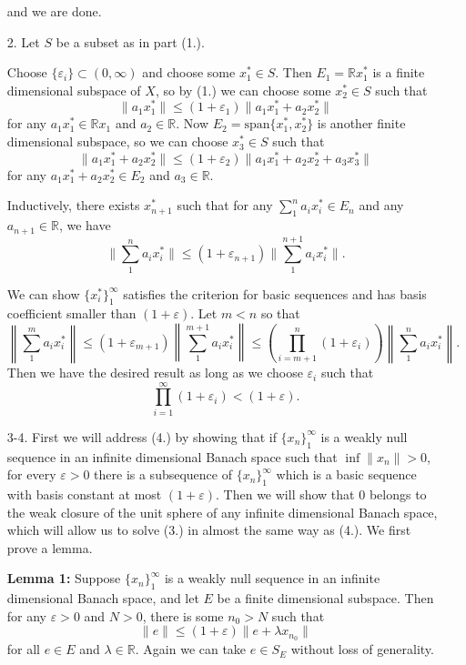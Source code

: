 \documentclass[11pt, reqno]{article}
\theoremstyle{plain}
\theoremstyle{definition}
\theoremstyle{remark}
\renewcommand{\epsilon}{\varepsilon}
\newcommand{\RR}{\mathbb{R}}
\begin{document}
\begin{enumerate}
    and we are done.

    \item[2.] Let $S$ be a subset as in part (1.). 
    
    Choose $\{\epsilon_i\} \subset (0, \infty)$ and choose some $x_1^* \in S$. Then $E_1 = \RR x_1^*$ is a finite
    dimensional subspace of $X$, so by (1.) we can choose some $x_2^* \in S$ such that 
    \[  
        \|a_1 x_1^*\| \leq (1 + \epsilon_1)\|a_1 x_1^* + a_2 x_2^*\|
    \]
    for any $a_1 x_1^* \in \RR x_1$ and $a_2 \in \RR$. Now $E_2 = \text{span}\{x_1^*, x_2^*\}$ is another finite dimensional
    subspace, so we can choose $x_3^* \in S$ such that
    \[
        \|a_1 x_1^* + a_2 x_2^*\| \leq (1 + \epsilon_2)\|a_1 x_1^* + a_2 x_2^* + a_3 x_3^*\|
    \]
    for any $a_1 x_1^* + a_2 x_2^* \in E_2$ and $a_3 \in \RR$.

    Inductively, there exists $x_{n + 1}^*$ such that for any $\sum_1^n a_i x_i^* \in E_n$ and any $a_{n + 1} \in \RR$,
    we have
    \[
        \|\sum_1^n a_i x_i^*\| \leq (1 + \epsilon_{n + 1})\|\sum_1^{n+1}a_i x_i^*\|.
    \]

    We can show $\{x_i^*\}_1^\infty$ satisfies the criterion for basic sequences and has basis coefficient
    smaller than $(1 + \epsilon)$. Let $m < n$ so that
    \[  
        \left\|\sum_1^m a_i x_i^*\right\| \leq (1 + \epsilon_{m+1})\left\|\sum_1^{m+1}a_i x_i^*\right\|
        \leq \left(\prod_{i = m+1}^n (1 + \epsilon_i)\right)\left\|\sum_1^n a_i x_i^*\right\|.
    \]
    Then we have the desired result as long as we choose $\epsilon_i$ such that
    \[
        \prod_{i = 1}^\infty (1 + \epsilon_i) < (1 + \epsilon).
    \]

    \item[3-4.] First we will address (4.) by showing that if $\{x_n\}_1^\infty$ is a weakly null sequence in 
    an infinite dimensional Banach space such that $\inf \|x_n\| > 0$, for every $\epsilon > 0$ there
    is a subsequence of $\{x_n\}_1^\infty$ which is a basic sequence with basis constant at most 
    $(1 + \epsilon)$. Then we will show that $0$ belongs to the weak closure of the unit sphere of any 
    infinite dimensional Banach space, which will allow us to solve (3.) in almost the same way as (4.). 
    We first prove a lemma.

    \textbf{Lemma 1:}
    Suppose $\{x_n\}_1^\infty$ is a weakly null sequence in an infinite dimensional Banach space, and 
    let $E$ be a finite dimensional subspace. Then for any $\epsilon > 0$ and $N > 0$, 
    there is some $n_0 > N$ such that 
    \[
        \|e\| \leq (1 + \epsilon)\|e + \lambda x_{n_0}\|
    \]
    for all $e \in E$ and $\lambda \in \RR$. Again we can take $e \in S_E$ without loss of generality.


\end{enumerate}
\end{document}

